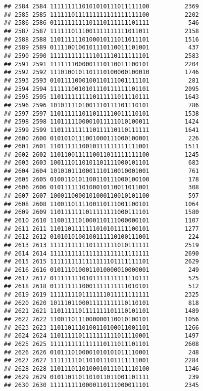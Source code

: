 \documentclass[]{article}
\begin{document}
\begin{verbatim}
## 2584 2584 1111111110101010111011111100          2369
## 2585 2585 1111110111111111111111111100          2202
## 2586 2586 0111111111101110111111101111           546
## 2587 2587 1111110111001111111111011011          2158
## 2588 2588 1101111110100010111011011101          1516
## 2589 2589 0111100100101110110011101001           437
## 2590 2590 1111111111111011110111111101          2583
## 2591 2591 1111111000001110110011100101          2204
## 2592 2592 1110100101101110100000100010          1746
## 2593 2593 0101111000100110111001111101           281
## 2594 2594 1111110010101110111111101101          2095
## 2595 2595 1101111111110111111011110111          1643
## 2596 2596 1010111101001110111101110101           786
## 2597 2597 1101111110110111110011110101          1538
## 2598 2598 1101111100001011111010100011          1424
## 2599 2599 1101111111110111110110111111          1641
## 2600 2600 0101010111001000111000100001           226
## 2601 2601 1101111110010111111111111001          1511
## 2602 2602 1101100111110011011111111100          1245
## 2603 2603 1001110110101101111000101101           683
## 2604 2604 1010101110001110110010001001           761
## 2605 2605 0100110101100110111000100100           178
## 2606 2606 0101111110100010110011011001           308
## 2607 2607 1000110000101000110010101100           597
## 2608 2608 1100110111100110111001100101          1064
## 2609 2609 1101111111011111111000111101          1580
## 2610 2610 1100111101000110111000000101          1107
## 2611 2611 1101101111111010101111100101          1277
## 2612 2612 0101010100100111110100111001           224
## 2613 2613 1111111111101111111010111111          2519
## 2614 2614 1111111111111111111111111111          2690
## 2615 2615 1111111111111111101111111101          2629
## 2616 2616 0101110100011010000010000001           249
## 2617 2617 0111111110101111111111110111           525
## 2618 2618 0111111110001111111111010101           512
## 2619 2619 1111111101111111011111111111          2325
## 2620 2620 1011101100011111111110110101           818
## 2621 2621 1101111101111111101110101101          1489
## 2622 2622 1100110111000000110010100101          1056
## 2623 2623 1101101110100110100011001101          1266
## 2624 2624 1101111101111111111011110001          1497
## 2625 2625 1111111111111110111011101101          2608
## 2626 2626 0101110100001010101011110001           248
## 2627 2627 1111111101101011101111111001          2284
## 2628 2628 1101110110100010111011110100          1346
## 2629 2629 0101101101101011011001101111           239
## 2630 2630 1111111110000110111000011101          2345

\end{verbatim}
\end{document}
